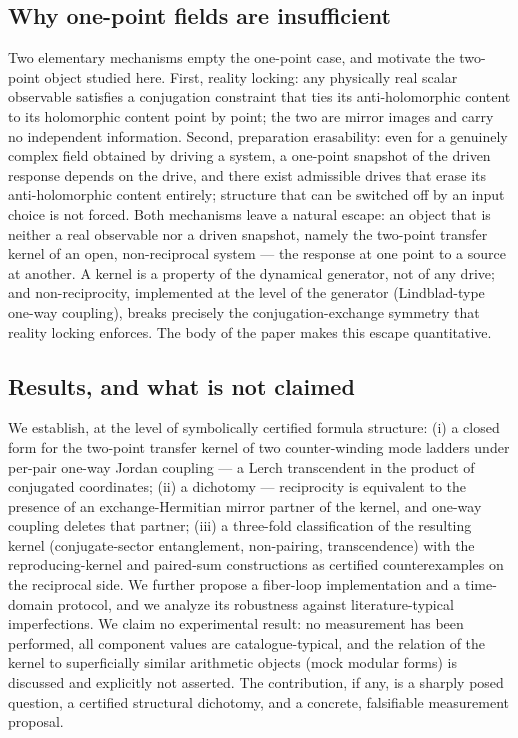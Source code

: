 \documentclass[11pt,a4paper]{article}
\begin{document}
\subsection{Why one-point fields are insufficient}

Two elementary mechanisms empty the one-point case, and motivate the two-point
object studied here. First, reality locking: any physically real scalar
observable satisfies a conjugation constraint that ties its anti-holomorphic
content to its holomorphic content point by point; the two are mirror images
and carry no independent information. Second, preparation erasability: even for
a genuinely complex field obtained by driving a system, a one-point snapshot of
the driven response depends on the drive, and there exist admissible drives
that erase its anti-holomorphic content entirely; structure that can be
switched off by an input choice is not forced. Both mechanisms leave a natural
escape: an object that is neither a real observable nor a driven snapshot,
namely the two-point transfer kernel of an open, non-reciprocal system --- the
response at one point to a source at another. A kernel is a property of the
dynamical generator, not of any drive; and non-reciprocity, implemented at the
level of the generator (Lindblad-type one-way coupling), breaks precisely the
conjugation-exchange symmetry that reality locking enforces. The body of the
paper makes this escape quantitative.

\subsection{Results, and what is not claimed}

We establish, at the level of symbolically certified formula structure: (i) a
closed form for the two-point transfer kernel of two counter-winding mode
ladders under per-pair one-way Jordan coupling --- a Lerch transcendent in the
product of conjugated coordinates; (ii) a dichotomy --- reciprocity is equivalent
to the presence of an exchange-Hermitian mirror partner of the kernel, and
one-way coupling deletes that partner; (iii) a three-fold classification of the
resulting kernel (conjugate-sector entanglement, non-pairing, transcendence)
with the reproducing-kernel and paired-sum constructions as certified
counterexamples on the reciprocal side. We further propose a fiber-loop
implementation and a time-domain protocol, and we analyze its robustness
against literature-typical imperfections. We claim no experimental result: no
measurement has been performed, all component values are catalogue-typical, and
the relation of the kernel to superficially similar arithmetic objects (mock
modular forms) is discussed and explicitly not asserted. The contribution, if
any, is a sharply posed question, a certified structural dichotomy, and a
concrete, falsifiable measurement proposal.
\end{document}
